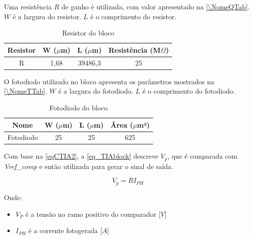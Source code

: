 Uma resist\^encia $R$ de ganho \'e utilizada, com valor apresentado na \autoref{\NomeQTab}. $W$ é a largura do resistor. $L$ é o comprimento do resistor.

\begin{table}[!h]
\caption{Resistor do bloco \NomeBloco}
\label{\NomeQTab}
\centering
\begin{tabular}{cccc}
\toprule
Resistor & W ($\mu$m)  & L ($\mu$m) & Resist\^encia (M$\Omega$)\\
\midrule \midrule
R & 1,68 & 39486,3 & 25\\
\bottomrule
\end{tabular}
\end{table}

O fotodiodo utilizado no bloco apresenta os par\^ametros mostrados na \autoref{\NomeTTab}. $W$ é a largura do fotodiodo. $L$ é o comprimento do fotodiodo.

\begin{table}[!h]
\caption{Fotodiodo do bloco \NomeBloco}
\label{\NomeTTab}
\centering
\begin{tabular}{cccc}
\toprule
Nome & W ($\mu$m)  & L ($\mu$m) & Área ($\mu$m²)\\
\midrule \midrule
Fotodiodo & 25 & 25 & 625\\
\bottomrule
\end{tabular}
\end{table}

Com base na \autoref{eqCTIA2}, a \autoref{eq_TIAblock} descreve $V_{p}$, que \'e comparada com \textit{Vref\_comp} e então utilizada para gerar o sinal de sa\'ida.

\begin{equation}
    \label{eq_TIAblock}
    V_{p} = RI_{PH}
\end{equation}

Onde:

\begin{itemize}

    \item \textit{$V_{P}$} \'e a tensão no ramo positivo do comparador [$V$]
    \item \textit{$I_{PH}$} \'e a corrente fotogerada [$A$]
    
\end{itemize}